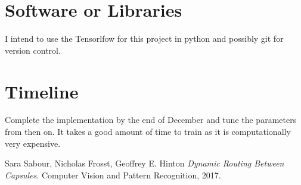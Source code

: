 \documentclass[10pt,twocolumn,letterpaper]{article}
\begin{document}
\section{Software or Libraries}
I intend to use the Tensorlfow for this project in python and possibly git for version control.

\section{Timeline}
Complete the implementation by the end of December and tune the parameters from then on. It takes a good amount of time to train as it is computationally very expensive.



\begin{thebibliography}{9}
	Sara Sabour, Nicholas Frosst, Geoffrey E. Hinton
	\textit{Dynamic Routing Between Capsules}. 
	Computer Vision and Pattern Recognition, 2017.
\end{thebibliography}
\end{document}
